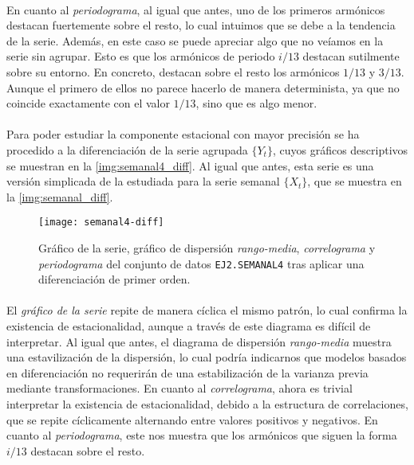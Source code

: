 \documentclass[a4paper, spanish]{article}
\begin{document}
      \paragraph{}
      En cuanto al \emph{periodograma}, al igual que antes, uno de los primeros armónicos destacan fuertemente sobre el resto, lo cual intuimos que se debe a la tendencia de la serie. Además, en este caso se puede apreciar algo que no veíamos en la serie sin agrupar. Esto es que los armónicos de periodo $i/13$ destacan sutilmente sobre su entorno. En concreto, destacan sobre el resto los armónicos $1/13$ y $3/13$. Aunque el primero de ellos no parece hacerlo de manera determinista, ya que no coincide exactamente con el valor $1/13$, sino que es algo menor.

      \paragraph{}
      Para poder estudiar la componente estacional con mayor precisión se ha procedido a la diferenciación de la serie agrupada $\{Y_t\}$, cuyos gráficos descriptivos se muestran en la \autoref{img:semanal4_diff}. Al igual que antes, esta serie es una versión simplicada de la estudiada para la serie semanal $\{X_t\}$, que se muestra en la \autoref{img:semanal_diff}.

      \begin{figure}[htb!]
        \centering
        \texttt{[image: semanal4-diff]}
        \caption{Gráfico de la serie, gráfico de dispersión \emph{rango-media}, \emph{correlograma} y \emph{periodograma} del conjunto de datos \texttt{EJ2.SEMANAL4} tras aplicar una diferenciación de primer orden.}
        \label{img:semanal4_diff}
      \end{figure}

      \paragraph{}
      El \emph{gráfico de la serie} repite de manera cíclica el mismo patrón, lo cual confirma la existencia de estacionalidad, aunque a través de este diagrama es difícil de interpretar. Al igual que antes, el diagrama de dispersión \emph{rango-media} muestra una estavilización de la dispersión, lo cual podría indicarnos que modelos basados en diferenciación no requerirán de una estabilización de la varianza previa mediante transformaciones. En cuanto al \emph{correlograma}, ahora es trivial interpretar la existencia de estacionalidad, debido a la estructura de correlaciones, que se repite cíclicamente alternando entre valores positivos y negativos. En cuanto al \emph{periodograma}, este nos muestra que los armónicos que siguen la forma $i/13$ destacan sobre el resto.
\end{document}
